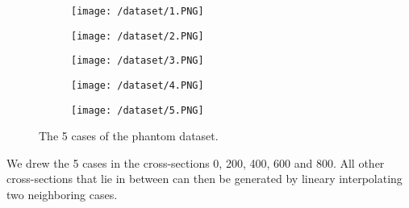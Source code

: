\documentclass[thesis.tex]{subfiles}
\begin{document}
\begin{figure}[!ht]
\centering
	\begin{subfigure}[t]{0.3\textwidth}
		\texttt{[image: /dataset/1.PNG]}
	\caption{}		
	\end{subfigure}
	\begin{subfigure}[t]{0.3\textwidth}
		\texttt{[image: /dataset/2.PNG]}		
\caption{}	
	\end{subfigure}
\begin{subfigure}[t]{0.3\textwidth}
		\texttt{[image: /dataset/3.PNG]}		
\caption{}	
	\end{subfigure}

\begin{subfigure}[t]{0.3\textwidth}
		\texttt{[image: /dataset/4.PNG]}		
\caption{}	
	\end{subfigure}
\begin{subfigure}[t]{0.3\textwidth}
		\texttt{[image: /dataset/5.PNG]}		
\caption{}	
	\end{subfigure}
	\caption{The 5 cases of the phantom dataset.}
\label{fig:phantomdata}
\end{figure}

We drew the 5 cases in the cross-sections 0, 200, 400, 600 and 800. All other cross-sections that lie in between can then be generated by lineary interpolating two neighboring cases. 
\end{document}
